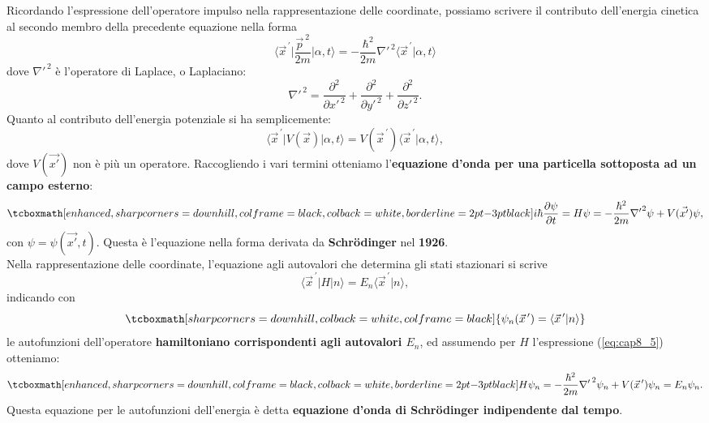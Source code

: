 Ricordando l'espressione dell'operatore impulso nella rappresentazione delle coordinate, possiamo scrivere il contributo dell'energia cinetica al secondo membro della precedente equazione nella forma
	\begin{equation}
		\langle {\vec{x}}^{\, \prime}\vert \frac{\vec{p}^{\ 2}}{2m} \vert \alpha , t \rangle = -\frac{\hbar^2}{2m}{{\nabla}'}^{\, 2}\langle {\vec{x}}^{\, \prime}\vert \alpha , t \rangle
\end{equation}
dove ${{\nabla}'}^{\, 2}$ è l'operatore di Laplace, o Laplaciano:
\begin{equation}
{{\nabla}'}^{\, 2}= \frac{\partial ^2}{\partial {x'} ^{\, 2}}+\frac{\partial ^2}{\partial {y'} ^{\, 2}}+\frac{\partial ^2}{\partial {z'} ^{\, 2}}.
\end{equation}
Quanto al contributo dell'energia potenziale si ha semplicemente:
	\begin{equation}
		\langle {\vec{x}}^{\, \prime}\vert V(\vec{x}) \vert \alpha , t \rangle = V({\vec{x}}^{\, \prime})\langle {\vec{x}}^{\, \prime}  \vert \alpha , t \rangle ,
	\end{equation}
dove $V(\vec{x'})$ non è più un operatore. Raccogliendo i vari termini otteniamo l'\textbf{equazione d'onda per una particella sottoposta ad un campo esterno}:
	\begin{equation}
		\tcboxmath[enhanced, sharp corners=downhill, colframe=black, colback=white, borderline={2pt}{-3pt}{black}]{
			i\hbar \frac{\partial \psi}{\partial t} = H\psi = -\frac{\hbar ^2}{2m}{\nabla '} ^2 \psi + V(\vec{x'}) \psi,
			}
\end{equation}
con $\psi =\psi(\vec{x'}, t)$. Questa è l'equazione nella forma derivata da \textbf{Schr\"{o}dinger} nel \textbf{1926}.\\

Nella rappresentazione delle coordinate, l'equazione agli autovalori che determina gli stati stazionari si scrive
	\begin{equation}
		\langle {\vec{x}}^{\, \prime} \vert H \vert n \rangle = E_n\langle {\vec{x}}^{\, \prime} \vert n \rangle,
	\end{equation}
indicando con
	\begin{equation}
		\tcboxmath[sharp corners=downhill, colback=white, colframe=black]{
			\psi _n ({\vec{x}}^{\, \prime}) = \langle {\vec{x}}^{\, \prime} \vert n \rangle
			}
	\end{equation}
le autofunzioni dell'operatore \textbf{hamiltoniano corrispondenti agli autovalori $E_n$}, ed assumendo per $H$ l'espressione (\ref{eq:cap8_5}) otteniamo:
	\begin{equation}
		\tcboxmath[enhanced, sharp corners=downhill, colframe=black, colback=white, borderline={2pt}{-3pt}{black}]{
			H\psi _n = -\frac{\hbar ^ 2}{2m}{{\nabla '}^{\, 2}} \psi _n + V({\vec{x}}^{\, \prime})\psi _n = E_n \psi _n.
			}
	\end{equation}
Questa equazione per le autofunzioni dell'energia è detta \textbf{equazione d'onda di Schr\"{o}dinger indipendente dal tempo}.\\

